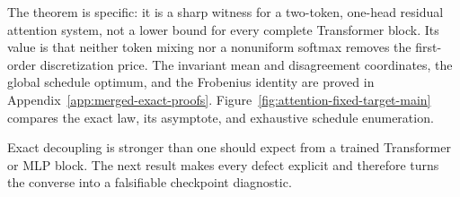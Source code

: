 \documentclass[twoside,11pt]{article}
\newcommand{\Z}{\mathcal{Z}}
\newcommand{\norm}[1]{\left\lVert #1\right\rVert}
\newcommand{\abs}[1]{\left\lvert #1\right\rvert}
\begin{document}
The theorem is specific: it is a sharp witness for a two-token,
one-head residual attention system, not a lower bound for every complete
Transformer block.  Its value is that neither token mixing nor a nonuniform
softmax removes the first-order discretization price.  The invariant mean and
disagreement coordinates, the global schedule optimum, and the Frobenius
identity are proved in Appendix~\ref{app:merged-exact-proofs}.  Figure~\ref{fig:attention-fixed-target-main} compares the exact law, its asymptote, and exhaustive schedule enumeration.


Exact decoupling is stronger than one should expect from a trained Transformer or MLP block.  The next result makes every defect explicit and therefore turns the converse into a falsifiable checkpoint diagnostic.

\end{document}
